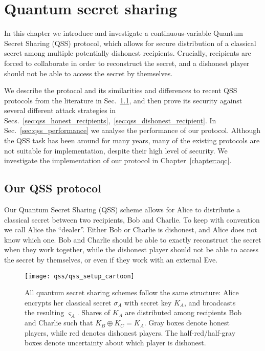 %

\chapter{Quantum secret sharing}


In this chapter we introduce and investigate a continuous-variable Quantum Secret Sharing (QSS) protocol, which allows for secure distribution of a classical secret among multiple potentially dishonest recipients. Crucially, recipients are forced to collaborate in order to reconstruct the secret, and a dishonest player should not be able to access the secret by themselves.

We describe the protocol and its similarities and differences to recent QSS protocols from the literature in Sec.~\ref{sec:qss_our_protocol}, and then prove its security against several different attack strategies in Secs.~\ref{sec:qss_honest_recipients},~\ref{sec:qss_dishonest_recipient}. In Sec.~\ref{sec:qss_performance} we analyse the performance of our protocol. Although the QSS task has been around for many years, many of the existing protocols are not suitable for implementation, despite their high level of security. We investigate the implementation of our protocol in Chapter~\ref{chapter:aqc}.

\section{Our QSS protocol}\label{sec:qss_our_protocol}

Our Quantum Secret Sharing (QSS) scheme allows for Alice to distribute a classical secret between two recipients, Bob and Charlie. To keep with convention we call Alice the ``dealer''. Either Bob or Charlie is dishonest, and Alice does not know which one. Bob and Charlie should be able to exactly reconstruct the secret when they work together, while the dishonest player should not be able to access the secret by themselves, or even if they work with an external Eve.


\begin{figure}[htp]
\captionsetup{width=0.8\linewidth}
\centering
\texttt{[image: qss/qss\_setup\_cartoon]}
\caption{\label{fig:qss_structure} All quantum secret sharing schemes follow the same structure: Alice encrypts her classical secret $\sigma_A$ with secret key $K_A$, and broadcasts the resulting $\varsigma_A$. Shares of $K_A$ are distributed among recipients Bob and Charlie such that $K_B \oplus K_C = K_A$. Gray boxes denote honest players, while red denotes dishonest players. The half-red/half-gray boxes denote uncertainty about which player is dishonest. %
}
\end{figure}

